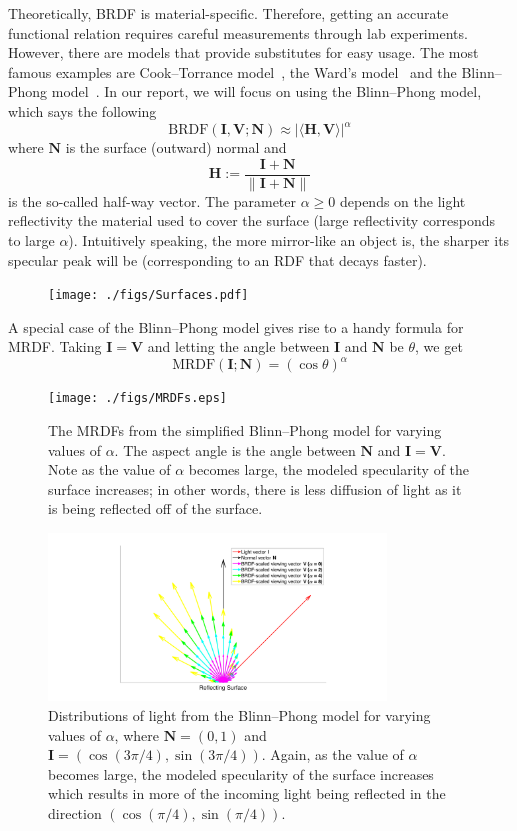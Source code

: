 \documentclass[11pt]{amsart}
\newcommand{\BRDF}{\mathrm{BRDF}}
\newcommand{\MRDF}{\mathrm{MRDF}}
\newcommand{\ip}[2]{\langle {#1}, {#2} \rangle}
\theoremstyle{definition}
\begin{document}
Theoretically, BRDF is material-specific. Therefore, getting an accurate functional
relation requires careful measurements through lab experiments. However, there
are models that provide substitutes for easy usage. The most famous examples
are Cook--Torrance model~\cite{CookTorr}, the Ward's model~\cite{Ward} and the
Blinn--Phong model~\cite{BlinnPhong}. In our report, we will focus on using the
Blinn--Phong model, which says the following
\[
   \BRDF(\mathbf{I},\mathbf{V};\mathbf{N})
   \approx
   |\ip{\mathbf{H}}{\mathbf{V}}|^\alpha
\]
where $\mathbf{N}$ is the surface (outward) normal and $$\mathbf{H}:=\frac{\mathbf{I}+\mathbf{N}} {\|\mathbf{I}+\mathbf{N}\|}$$
is the so-called half-way vector. The parameter $\alpha \geq 0$ depends on the light reflectivity the material used to cover the surface (large reflectivity corresponds to large $\alpha$). Intuitively speaking, the more mirror-like an object is,  the sharper its specular peak will be (corresponding to an RDF that decays faster). 

\begin{figure}[H]
 \texttt{[image: ./figs/Surfaces.pdf]}
\end{figure}

A special case of the Blinn--Phong model gives rise to a handy formula for MRDF. Taking $\mathbf{I}=\mathbf{V}$ and letting the angle between $\mathbf{I}$ and $\mathbf{N}$ be $\theta$, we get
\[
\MRDF(\mathbf{I};\mathbf{N})=(\cos \theta)^\alpha
\]

\begin{figure}[H]
 \texttt{[image: ./figs/MRDFs.eps]}
 \caption{The MRDFs from the simplified Blinn--Phong model for varying values of $\alpha$. The aspect angle is the angle between $\mathbf{N}$ and $\mathbf{I}=\mathbf{V}$. Note as the value of $\alpha$ becomes large, the modeled specularity of the surface increases; in other words, there is less diffusion of light as it is being reflected off of the surface.}
 \label{MRDFs}
\end{figure}

\begin{figure}[H]
 \includegraphics[width=0.8\textwidth]{./figs/BRDF_Vectors.pdf}
 \caption{Distributions of light from the Blinn--Phong model for varying values of $\alpha$, where $\mathbf{N} = (0,1)$ and $\mathbf{I} = (\cos(3\pi/4),\sin(3\pi/4))$. Again, as the value of $\alpha$ becomes large, the modeled specularity of the surface increases which results in more of the incoming light being reflected in the direction $(\cos(\pi/4),\sin(\pi/4))$.}
 \label{BRDFVectors}
\end{figure}
\end{document}

